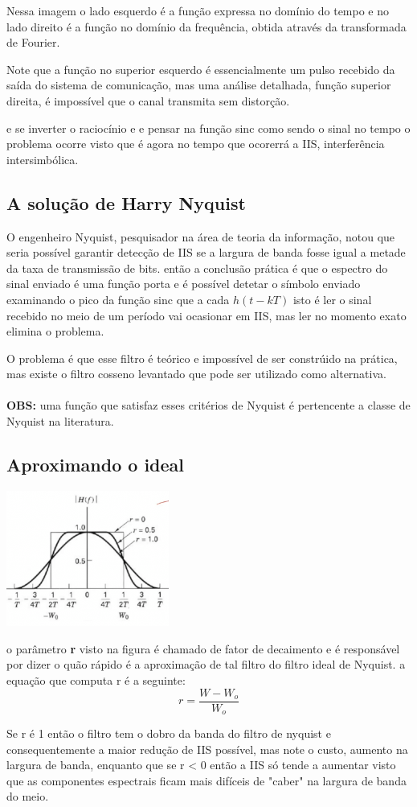 Nessa imagem o lado esquerdo é a função expressa no domínio do tempo e no lado direito é a função no domínio da frequência, obtida através da transformada de Fourier.

Note que a função no superior esquerdo é essencialmente um pulso recebido da saída do sistema de comunicação, mas uma análise detalhada, função superior direita, é impossível
que o canal transmita sem distorção.

e se inverter o raciocínio e e pensar na função sinc como sendo o sinal no tempo o problema ocorre visto que é agora no tempo que ocorerrá a IIS, interferência intersimbólica.

\subsection{A solução de Harry Nyquist}

O engenheiro Nyquist, pesquisador na área de teoria da informação, notou que seria possível garantir detecção de IIS se a largura de banda fosse igual a metade da taxa de transmissão de bits.
então a conclusão prática é que o espectro do sinal enviado é uma função porta e é possível detetar o símbolo enviado examinando o pico da função sinc que a cada $h(t-kT)$ isto é ler o sinal recebido
no meio de um período vai ocasionar em IIS, mas ler no momento exato elimina o problema.

O problema é que esse filtro é teórico e impossível de ser constrúido na prática, mas existe o filtro cosseno levantado que pode ser utilizado como alternativa.
\\\\
\textbf{OBS:} uma função que satisfaz esses critérios de Nyquist é pertencente a classe de Nyquist na literatura.

\subsection{Aproximando o ideal}


\includegraphics[width=0.4\textwidth]{../assets/cos.png}\cite{dc}

o parâmetro \textbf{r} visto na figura  é chamado de fator de decaimento e é responsável por dizer o quão rápido é a aproximação de tal filtro do filtro ideal de Nyquist.
a equação que computa r é a seguinte:
\begin{equation}
	r = \frac{W - W_o}{W_o}
\end{equation}

Se r é 1 então o filtro tem o dobro da banda do filtro de nyquist e consequentemente a maior redução de IIS possível, mas note o custo, aumento na largura de banda, enquanto que se
r < 0 então a IIS só tende a aumentar visto que as componentes espectrais ficam mais difíceis de "caber" na largura de banda do meio.


